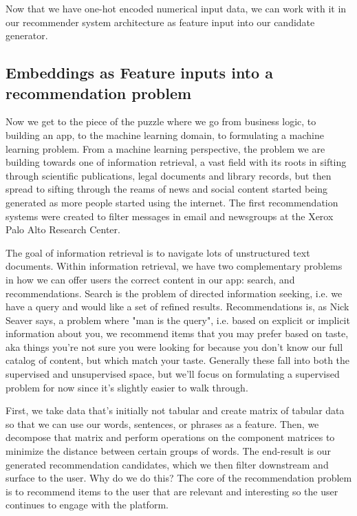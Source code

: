 \documentclass[11pt]{diazessay} %
\begin{document}
Now that we have one-hot encoded numerical input data, we can work with it in our recommender system architecture as feature input into our candidate generator.

\subsection{Embeddings as Feature inputs into a recommendation problem}
Now we get to the piece of the puzzle where we go from business logic, to building an app, to the machine learning domain, to formulating a machine learning problem. From a machine learning perspective, the problem we are building towards one of  information retrieval, a vast field with its roots in sifting through scientific publications, legal documents and library records, but then spread to sifting through the reams of news and social content started being generated as more people started using the internet. The first recommendation systems were created to filter messages in email and newsgroups\citep{goldberg1992using}  at the Xerox Palo Alto Research Center. 
	
The goal of information retrieval is to navigate lots of unstructured text documents. Within information retrieval, we have two complementary problems in how we can offer users the correct content in our app: search, and recommendations. Search is the problem of directed\citep{ekstrand2019recommender} information seeking, i.e. we have a query and would like a set of refined results. Recommendations is, as Nick Seaver \citep{seaver2022computing} says, a problem where "man is the query", i.e. based on explicit or implicit information about you, we recommend items that you may prefer based on taste, aka things you're not sure you were looking for because you don't know our full catalog of content, but which match your taste.  Generally these fall into both the supervised and unsupervised space, but we'll focus on formulating a supervised problem for now since it's slightly easier to walk through. 

 First, we take data that’s initially not tabular and create matrix of tabular data so that we can use our words, sentences, or phrases as a feature. Then, we decompose that matrix and perform operations on the component matrices to minimize the distance between certain groups of words. The end-result is our generated recommendation candidates, which we then filter downstream and surface to the user.  Why do we do this? The core of the recommendation problem is to recommend items to the user that are relevant and interesting so the user continues to engage with the platform. 
\end{document}

